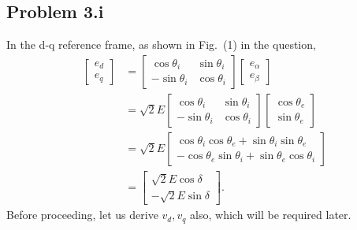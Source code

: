 \subsection*{Problem 3.i}
In the d-q reference frame, as shown in Fig.~(1) in the question,
\begin{align}\label{eq:e_d_q}
	\begin{bmatrix}
		e_d\\e_q
	\end{bmatrix} &= \begin{bmatrix}
		\cos \theta_i & \sin \theta_i\\
		-\sin \theta_i & \cos \theta_i
	\end{bmatrix}\begin{bmatrix}
		e_{\alpha}\\e_{\beta}
	\end{bmatrix} \nonumber\\
	&= \sqrt{2}E\begin{bmatrix}
	\cos \theta_i & \sin \theta_i\\
	-\sin \theta_i & \cos \theta_i
	\end{bmatrix}\begin{bmatrix}
		\cos \theta_e\\\sin \theta_e
	\end{bmatrix} \nonumber\\
	&= \sqrt{2}E\begin{bmatrix}
		\cos \theta_i \cos \theta_e + \sin \theta_i \sin \theta_e\\
		-\cos \theta_e \sin \theta_i + \sin \theta_e \cos \theta_i
	\end{bmatrix} \nonumber \\
	&= \begin{bmatrix}
		\sqrt{2}E \cos \delta\\
		-\sqrt{2}E \sin \delta
	\end{bmatrix}.
\end{align}
Before proceeding, let us derive $v_d, v_q$ also, which will be required later.
